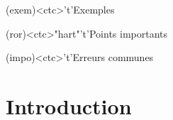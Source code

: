 \documentclass[../../main/main.tex]{subfiles}
\begin{document}
\begin{tcn}[%
		sidebyside, fontupper=\small, fontlower=\small
	]
	\begin{tcn}[nsp](exem)<ctc>'t'{Exemples}
		\vspace{-25pt}
	\end{tcn}
	\begin{tcn}[nsp](ror)<ctc>"hart"'t'{Points importants}
		\vspace{-25pt}
	\end{tcn}
	\begin{tcn}[nsp](impo)<ctc>'t'{Erreurs communes}
		\vspace{-25pt}
	\end{tcn}
\end{tcn}

\vspace*{\fill}

\newpage


\section{Introduction}
\end{document}

